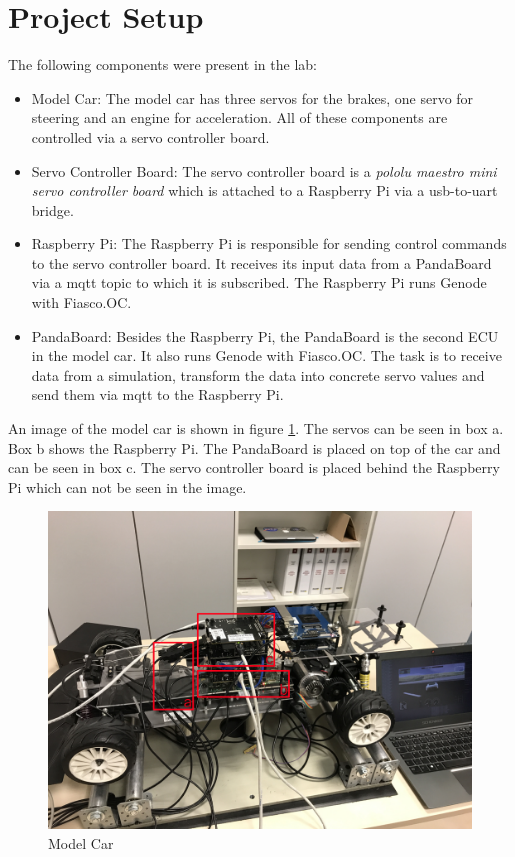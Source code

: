 \section{Project Setup}
\label{sec:setup}
The following components were present in the lab:

\begin{itemize}
    \item Model Car: The model car has three servos for the brakes, one servo for steering and an engine for acceleration. All of these components are controlled via a servo controller board.
   
    \item Servo Controller Board: The servo controller board is a \textit{pololu maestro mini servo controller board} which is attached to a Raspberry Pi via a usb-to-uart bridge.
   
    \item Raspberry Pi: The Raspberry Pi is responsible for sending control commands to the servo controller board. It receives its input data from a PandaBoard via a mqtt topic to which it is subscribed. The Raspberry Pi runs Genode with Fiasco.OC.
   
    \item PandaBoard: Besides the Raspberry Pi, the PandaBoard is the second ECU in the model car. It also runs Genode with Fiasco.OC. The task is to receive data from a simulation, transform the data into concrete servo values and send them via mqtt to the Raspberry Pi.
\end{itemize}

An image of the model car is shown in figure \ref{fig:model}. The servos can be seen in box a. Box b shows the Raspberry Pi. The PandaBoard is placed on top of the car and can be seen in box c. The servo controller board is placed behind the Raspberry Pi which can not be seen in the image. \\

\begin{figure}[h]
       \centering
       \includegraphics[trim={0 5cm 0 30cm},clip,width=1.0\linewidth]{images/model}
       \caption{Model Car}
       \label{fig:model}
\end{figure}

